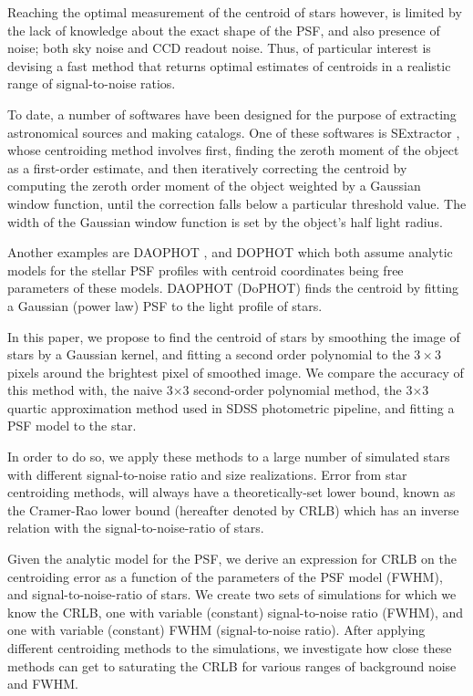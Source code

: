 \documentclass[12pt, preprint]{aastex}
\begin{document}
Reaching the optimal measurement of the centroid of stars however, is limited
by the lack of knowledge about the exact shape of the PSF, and also presence of noise;
both sky noise and CCD readout noise. Thus, of particular interest is devising a fast method that returns
optimal estimates of centroids in a realistic range of signal-to-noise ratios.

To date, a number of softwares have been designed for the purpose of extracting astronomical
sources and making catalogs. One of these softwares is SExtractor \citep{sex},
whose centroiding method involves first, finding the zeroth moment of the object
as a first-order estimate, and then iteratively correcting the centroid by computing
the zeroth order moment of the object weighted by a Gaussian window function,
until the correction falls below a particular threshold value.
The width of the Gaussian window function is set by the object's half light radius.

Another examples are DAOPHOT \citep{daophot}, and DOPHOT \citep{dophot}
which both assume analytic models for the stellar PSF profiles with centroid
coordinates being free parameters of these models.
DAOPHOT (DoPHOT) finds the centroid by fitting a Gaussian (power law) PSF to
the light profile of stars.

In this paper, we propose to find the centroid of stars by smoothing the image
of stars by a Gaussian kernel, and fitting a second order polynomial to
the $3\times$3 pixels around the brightest pixel of smoothed image.
We compare the accuracy of this method with, the naive 3$\times$3 second-order 
polynomial method, the 3$\times$3 quartic approximation
method used in SDSS photometric pipeline, and fitting a PSF model to the 
star.

In order to do so, we apply these methods to a large number of simulated
stars with different signal-to-noise ratio and size realizations. 
Error from star centroiding methods, will always have 
a theoretically-set lower bound, known as the Cramer-Rao lower bound
(hereafter denoted by CRLB) which has an inverse relation with the
signal-to-noise-ratio of stars.

Given the analytic model for the PSF,
we derive an expression for CRLB on the centroiding error as
a function of the parameters of the PSF model (\eg FWHM),
and signal-to-noise-ratio of stars. We create two sets of simulations for which we 
know the CRLB, one with variable (constant) signal-to-noise ratio (FWHM), and one 
with variable (constant) FWHM (signal-to-noise ratio). After applying
different centroiding methods to the simulations,
we investigate how close these methods can get to saturating the CRLB for
various ranges of background noise and FWHM.
\end{document}
